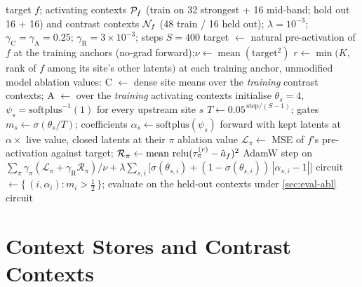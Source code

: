 \documentclass[10pt]{article}
\begin{document}
\begin{algorithm}
\caption{Weighted circuit masking, WCM[Z+C+A] with rank-keep (one target $f$; protocol v1, \cref{tab:protocol})}
\label{alg:ablmask}
\begin{algorithmic}[1]
\Require target $f$; activating contexts $\mathcal{P}_f$ (train on 32 strongest + 16 mid-band; hold out 16 + 16) and contrast contexts $\mathcal{N}_f$ (48 train / 16 held out); $\lambda = 10^{-3}$; $\gamma_{\mathrm{C}} = \gamma_{\mathrm{A}} = 0.25$; $\gamma_{\mathrm{R}} = 3 \times 10^{-3}$; steps $S = 400$
\State target $\gets$ natural pre-activation of $f$ at the training anchors (no-grad forward);\quad $\nu \gets \operatorname{mean}(\text{target}^2)$
\State $r \gets \min(K,\ $rank of $f$ among its site's other latents$)$ at each training anchor, unmodified model
\State ablation values: C $\gets$ dense site means over the \emph{training} contrast contexts; A $\gets$ over the \emph{training} activating contexts
\State initialise $\theta_s = 4$, $\psi_s = \mathrm{softplus}^{-1}(1)$ for every upstream site $s$
    \State $T \gets 0.05^{\,\text{step}/(S - 1)}$; \quad gates $m_s \gets \sigma(\theta_s / T)$; \quad coefficients $\alpha_s \gets \mathrm{softplus}(\psi_s)$ 
     
        \State forward with kept latents at $\alpha \times$ live value, closed latents at their $\pi$ ablation value
        \State $\mathcal{L}_{\pi} \gets$ MSE of $f$'s pre-activation against target; \quad $\mathcal{R}_{\pi} \gets \operatorname{mean}\,\operatorname{relu}(\tau^{(r)}_{\pi} - \hat{a}_f)^2$
    \EndFor
    \State AdamW step on $\sum_{\pi} \gamma_{\pi}(\mathcal{L}_{\pi} + \gamma_{\mathrm{R}}\mathcal{R}_{\pi})/\nu + \lambda \sum_{s,i} \bigl[\sigma(\theta_{s,i}) + (1 - \sigma(\theta_{s,i}))\,|\alpha_{s,i} - 1|\bigr]$ 
\EndFor
\State circuit $\gets \{\,(i, \alpha_i) : m_i > \tfrac{1}{2}\,\}$; evaluate on the held-out contexts under \cref{sec:eval-abl}
\State \Return circuit
\end{algorithmic}
\end{algorithm}

\FloatBarrier

\section{Context Stores and Contrast Contexts}
\label{app:stores}
\end{document}
